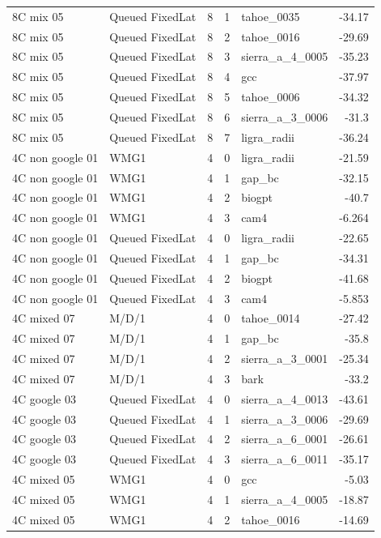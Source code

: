 \begin{tabular}{llrrlr}
8C mix 05 & Queued FixedLat & 8 & 1 & tahoe\_0035 & -34.17 \\
8C mix 05 & Queued FixedLat & 8 & 2 & tahoe\_0016 & -29.69 \\
8C mix 05 & Queued FixedLat & 8 & 3 & sierra\_a\_4\_0005 & -35.23 \\
8C mix 05 & Queued FixedLat & 8 & 4 & gcc & -37.97 \\
8C mix 05 & Queued FixedLat & 8 & 5 & tahoe\_0006 & -34.32 \\
8C mix 05 & Queued FixedLat & 8 & 6 & sierra\_a\_3\_0006 & -31.3 \\
8C mix 05 & Queued FixedLat & 8 & 7 & ligra\_radii & -36.24 \\
4C non google 01 & WMG1 & 4 & 0 & ligra\_radii & -21.59 \\
4C non google 01 & WMG1 & 4 & 1 & gap\_bc & -32.15 \\
4C non google 01 & WMG1 & 4 & 2 & biogpt & -40.7 \\
4C non google 01 & WMG1 & 4 & 3 & cam4 & -6.264 \\
4C non google 01 & Queued FixedLat & 4 & 0 & ligra\_radii & -22.65 \\
4C non google 01 & Queued FixedLat & 4 & 1 & gap\_bc & -34.31 \\
4C non google 01 & Queued FixedLat & 4 & 2 & biogpt & -41.68 \\
4C non google 01 & Queued FixedLat & 4 & 3 & cam4 & -5.853 \\
4C mixed 07 & M/D/1 & 4 & 0 & tahoe\_0014 & -27.42 \\
4C mixed 07 & M/D/1 & 4 & 1 & gap\_bc & -35.8 \\
4C mixed 07 & M/D/1 & 4 & 2 & sierra\_a\_3\_0001 & -25.34 \\
4C mixed 07 & M/D/1 & 4 & 3 & bark & -33.2 \\
4C google 03 & Queued FixedLat & 4 & 0 & sierra\_a\_4\_0013 & -43.61 \\
4C google 03 & Queued FixedLat & 4 & 1 & sierra\_a\_3\_0006 & -29.69 \\
4C google 03 & Queued FixedLat & 4 & 2 & sierra\_a\_6\_0001 & -26.61 \\
4C google 03 & Queued FixedLat & 4 & 3 & sierra\_a\_6\_0011 & -35.17 \\
4C mixed 05 & WMG1 & 4 & 0 & gcc & -5.03 \\
4C mixed 05 & WMG1 & 4 & 1 & sierra\_a\_4\_0005 & -18.87 \\
4C mixed 05 & WMG1 & 4 & 2 & tahoe\_0016 & -14.69 \\

\end{tabular}
